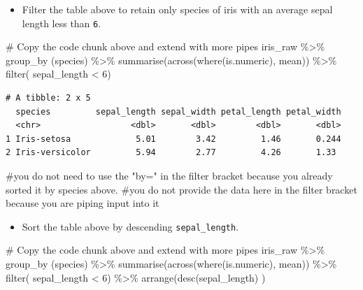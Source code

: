 \documentclass[
  letterpaper,
  DIV=11,
  numbers=noendperiod]{scrartcl}
\newenvironment{Shaded}{\begin{snugshade}}{\end{snugshade}}
\newcommand{\CommentTok}[1]{\textcolor[rgb]{0.37,0.37,0.37}{#1}}
\newcommand{\DecValTok}[1]{\textcolor[rgb]{0.68,0.00,0.00}{#1}}
\newcommand{\FunctionTok}[1]{\textcolor[rgb]{0.28,0.35,0.67}{#1}}
\newcommand{\NormalTok}[1]{\textcolor[rgb]{0.00,0.23,0.31}{#1}}
\newcommand{\SpecialCharTok}[1]{\textcolor[rgb]{0.37,0.37,0.37}{#1}}
\providecommand{\tightlist}{%
  \setlength{\itemsep}{0pt}\setlength{\parskip}{0pt}}\usepackage{longtable,booktabs,array}
\begin{document}
\begin{itemize}
\tightlist
\item
  Filter the table above to retain only species of iris with an average
  sepal length less than \texttt{6}.
\end{itemize}

\begin{Shaded}
\begin{Highlighting}[]
\CommentTok{\# Copy the code chunk above and extend with more pipes}
\NormalTok{iris\_raw }\SpecialCharTok{\%\textgreater{}\%} 
  \FunctionTok{group\_by}\NormalTok{ (species) }\SpecialCharTok{\%\textgreater{}\%} 
  \FunctionTok{summarise}\NormalTok{(}\FunctionTok{across}\NormalTok{(}\FunctionTok{where}\NormalTok{(is.numeric), mean)) }\SpecialCharTok{\%\textgreater{}\%} 
  \FunctionTok{filter}\NormalTok{( sepal\_length }\SpecialCharTok{\textless{}} \DecValTok{6}\NormalTok{)}
\end{Highlighting}
\end{Shaded}

\begin{verbatim}
# A tibble: 2 x 5
  species         sepal_length sepal_width petal_length petal_width
  <chr>                  <dbl>       <dbl>        <dbl>       <dbl>
1 Iris-setosa             5.01        3.42         1.46       0.244
2 Iris-versicolor         5.94        2.77         4.26       1.33 
\end{verbatim}

\begin{Shaded}
\begin{Highlighting}[]
\CommentTok{\#you do not need to use the "by=" in the filter bracket because you already sorted it by species above.}
\CommentTok{\#you do not provide the data here in the filter bracket because you are piping input into it}
\end{Highlighting}
\end{Shaded}

\begin{itemize}
\tightlist
\item
  Sort the table above by descending \texttt{sepal\_length}.
\end{itemize}

\begin{Shaded}
\begin{Highlighting}[]
\CommentTok{\# Copy the code chunk above and extend with more pipes}
\NormalTok{iris\_raw }\SpecialCharTok{\%\textgreater{}\%} 
  \FunctionTok{group\_by}\NormalTok{ (species) }\SpecialCharTok{\%\textgreater{}\%} 
  \FunctionTok{summarise}\NormalTok{(}\FunctionTok{across}\NormalTok{(}\FunctionTok{where}\NormalTok{(is.numeric), mean)) }\SpecialCharTok{\%\textgreater{}\%} 
  \FunctionTok{filter}\NormalTok{( sepal\_length }\SpecialCharTok{\textless{}} \DecValTok{6}\NormalTok{) }\SpecialCharTok{\%\textgreater{}\%} 
  \FunctionTok{arrange}\NormalTok{(}\FunctionTok{desc}\NormalTok{(sepal\_length) )}
\end{Highlighting}
\end{Shaded}
\end{document}
